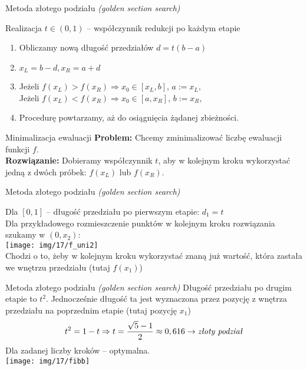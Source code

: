   \begin{frame}{Metoda złotego podziału \emph{(golden section search)}}
    \begin{block}{Realizacja}
      $t\in(0,1)$ -- współczynnik redukcji po każdym etapie
      \begin{enumerate}
        \item Obliczamy nową długość przedziałów $ d = t(b - a) $
        \item $ x_L = b - d, x_R = a + d $
        \item Jeżeli $ f(x_L) > f(x_R) \Rightarrow x_0 \in [x_L, b] $,
              $ a := x_L \text{, } $\\
              Jeżeli $ f(x_L) < f(x_R) \Rightarrow x_0 \in [a, x_R] $,
              $ b := x_R \text{, } $
        \item Procedurę powtarzamy, aż do osiągnięcia żądanej zbieżności.
      \end{enumerate}
    \end{block}
    \begin{block}{Minimalizacja ewaluacji}
      \textbf{Problem:} Chcemy zminimalizować liczbę ewaluacji funkcji $f$.\\
      \textbf{Rozwiązanie:} Dobieramy współczynnik $t$, aby w kolejnym kroku wykorzystać jedną z dwóch próbek: $f(x_L)$ lub $f(x_R)$.
    \end{block}
  \end{frame}
  \begin{frame}{Metoda złotego podziału \emph{(golden section search)}}
   
   
    Dla $[0, 1]$ -- długość przedziału po pierwszym etapie: $d_1 = t$\\ 
    Dla przykładowego rozmieszczenie punktów w kolejnym kroku rozwiązania szukamy w $(0, x_2)$:\\
    \centering
    \texttt{[image: img/17/f\_uni2]}\\
    Chodzi o to, żeby w kolejnym kroku wykorzystać znaną już wartość, która zastała we wnętrzu przedziału (tutaj $f(x_1)$)
  \end{frame}

  \begin{frame}{Metoda złotego podziału \emph{(golden section search)}}
    Długość przedziału po drugim etapie to $t^{2}$. Jednocześnie długość ta jest wyznaczona przez pozycję z wnętrza przedziału na poprzednim etapie (tutaj pozycję  $x_1$)
    \begin{displaymath}
      t^{2} = 1 - t \Rightarrow t = \frac{\sqrt{5} - 1}{2} \approx 0,616 \to \text{\emph{złoty podział}}
    \end{displaymath}
    Dla zadanej liczby kroków -- optymalna.\\
    \centering
    \texttt{[image: img/17/fibb]}
  \end{frame}

